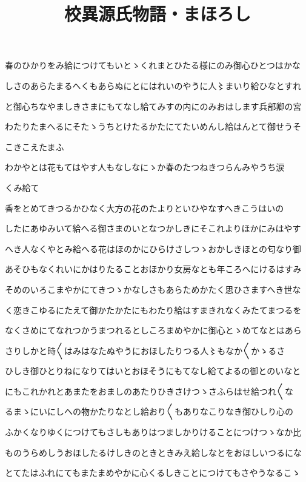 \documentclass[a4paper,11pt,landscape]{ltjtarticle}
\title{校異源氏物語・まほろし}
\date{}
\begin{document}
\maketitle

春のひかりをみ給につけてもいとゝくれまとひたる様にのみ御心ひとつはかな
\par\medskip
しさのあらたまるへくもあらぬにとにはれいのやうに人〻まいり給ひなとすれ
\par\medskip
と御心ちなやましきさまにもてなし給てみすの内にのみおはします兵部卿の宮
\par\medskip
わたりたまへるにそたゝうちとけたるかたにてたいめんし給はんとて御せうそ
\par\medskip
こきこえたまふ
\par\medskip
わかやとは花もてはやす人もなしなにゝか春のたつねきつらんみやうち涙
\par\medskip
くみ給て
\par\medskip
香をとめてきつるかひなく大方の花のたよりといひやなすへきこうはいの
\par\medskip
したにあゆみいて給へる御さまのいとなつかしきにそこれよりほかにみはやす
\par\medskip
へき人なくやとみ給へる花はほのかにひらけさしつゝおかしきほとの匂なり御
\par\medskip
あそひもなくれいにかはりたることおほかり女房なとも年ころへにけるはすみ
\par\medskip
そめのいろこまやかにてきつゝかなしさもあらためかたく思ひさますへき世な
\par\medskip
く恋きこゆるにたえて御かたかたにもわたり給はすまきれなくみたてまつるを
\par\medskip
なくさめにてなれつかうまつれるとしころまめやかに御心とゝめてなとはあら
\par\medskip
さりしかと時〱はみはなたぬやうにおほしたりつる人〻もなか〱かゝるさ
\par\medskip
ひしき御ひとりねになりてはいとおほそうにもてなし給てよるの御とのいなと
\par\medskip
にもこれかれとあまたをおましのあたりひきさけつゝさふらはせ給つれ〱な
\par\medskip
るまゝにいにしへの物かたりなとし給おり〱もありなこりなき御ひしり心の
\par\medskip
ふかくなりゆくにつけてもさしもありはつましかりけることにつけつゝなか比
\par\medskip
ものうらめしうおほしたるけしきのときときみえ給しなとをおほしいつるにな
\par\medskip
とてたはふれにてもまたまめやかに心くるしきことにつけてもさやうなるこゝ
\end{document}
